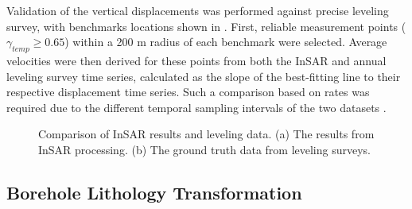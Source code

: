 Validation of the vertical displacements was performed against precise leveling survey, with benchmarks locations shown in . First, reliable measurement points ($\gamma_\textit{temp} \ge 0.65$) within a 200 m radius of each benchmark were selected. Average velocities were then derived for these points from both the InSAR and annual leveling survey time series, calculated as the slope of the best-fitting line to their respective displacement time series. Such a comparison based on rates was required due to the different temporal sampling intervals of the two datasets .

\begin{figure}[H]
	\centering
	\begin{subfigure}[b]{0.3\textwidth}
		\centering
		\framebox{\rule{0pt}{8cm}\rule{\textwidth}{0pt}}
		\caption{}
		\label{fig:insar_leveling_a}
	\end{subfigure}
	\quad
	\begin{subfigure}[b]{0.3\textwidth}
		\centering
		\framebox{\rule{0pt}{8cm}\rule{\textwidth}{0pt}}
		\caption{}
		\label{fig:insar_leveling_b}
	\end{subfigure}
	\caption{Comparison of InSAR results and leveling data. (a) The results from InSAR processing. (b) The ground truth data from leveling surveys.}
	\label{fig:insar_leveling}
\end{figure}

\subsection{Borehole Lithology Transformation}
\label{subsec:borehole_ilr}

